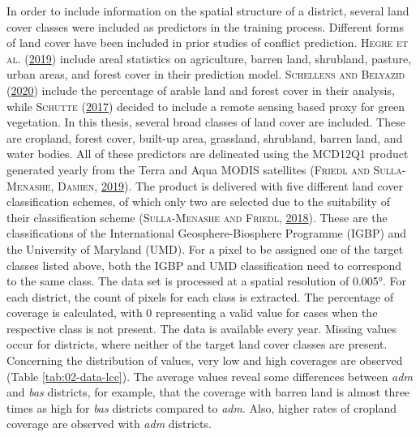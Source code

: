 \documentclass[a4paper,11pt]{article}
\begin{document}
In order to include information on the spatial structure of a district,
several land cover classes were included as predictors in the training process.
Different forms of land cover have been included in prior studies of conflict
prediction. \textsc{\textnormal{Hegre} \textnormal{et al.}} \textsc{(\textnormal{\protect\hyperlink{ref-hegre2019}{2019}})} include areal statistics on agriculture, barren land,
shrubland, pasture, urban areas, and forest cover in their prediction
model. \textsc{\textnormal{Schellens} and \textnormal{Belyazid}} \textsc{(\textnormal{\protect\hyperlink{ref-schellens2020}{2020}})} include the percentage of arable land and forest cover in
their analysis, while \textsc{\textnormal{Schutte}} \textsc{(\textnormal{\protect\hyperlink{ref-schutte2017}{2017}})} decided to include a remote sensing based
proxy for green vegetation. In this thesis, several broad classes of land cover are included.
These are cropland, forest cover, built-up area, grassland, shrubland, barren land,
and water bodies. All of these predictors are delineated using the MCD12Q1 product
generated yearly from the Terra and Aqua MODIS satellites \textsc{(\textnormal{\textsc{Friedl} and \textsc{Sulla-Menashe, Damien}}, \textnormal{\protect\hyperlink{ref-friedlmark2019}{2019}})}. The
product is delivered with five different land cover classification schemes,
of which only two are selected due to the suitability of their classification
scheme \textsc{(\textnormal{\textsc{Sulla-Menashe} and \textsc{Friedl}}, \textnormal{\protect\hyperlink{ref-sulla2018}{2018}})}. These are the classifications of the International
Geosphere-Biosphere Programme (IGBP) and the University of Maryland (UMD).
For a pixel to be assigned one of the target classes listed above, both the IGBP
and UMD classification need to correspond to the same class. The data set is
processed at a spatial resolution of 0.005°. For each district, the count of
pixels for each class is extracted. The percentage of coverage is calculated,
with 0 representing a valid value for cases when the respective class is not
present. The data is available every year. Missing values occur for districts,
where neither of the target land cover classes are present.
Concerning the distribution of values, very low and high coverages are observed
(Table \ref{tab:02-data-lcc}). The average values reveal some differences between
\emph{adm} and \emph{bas} districts, for example, that the coverage with barren land is almost
three times as high for \emph{bas} districts compared to \emph{adm}. Also, higher rates
of cropland coverage are observed with \emph{adm} districts.
\end{document}
